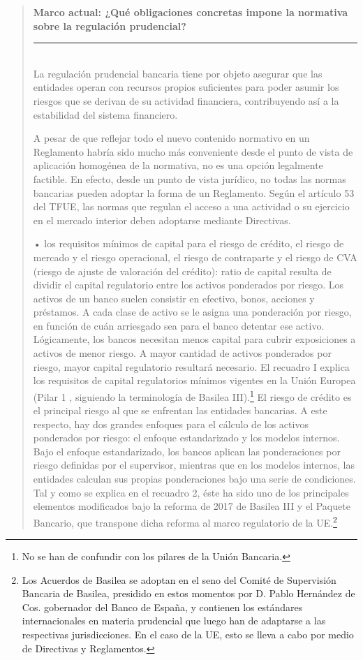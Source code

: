 \documentclass[10pt,a4paper]{article}
\newenvironment{specialblock}[1]{%
      \begin{quote} %
      \small %
      \noindent\textbf{#1}\\[-0.3em] %
      \rule{\linewidth}{0.4pt}\\[0.6em]}{
      \end{quote}}
\begin{document}
\begin{specialblock}{Marco actual: ¿Qué obligaciones concretas impone la normativa sobre la regulación prudencial?}
    La regulación prudencial bancaria tiene por objeto asegurar que las entidades operan con recursos propios suficientes para poder asumir los riesgos que se derivan de su actividad financiera, contribuyendo así a la estabilidad del sistema financiero. 

    A pesar de que reflejar todo el nuevo contenido normativo en un Reglamento habría sido mucho más conveniente desde el punto de vista de aplicación homogénea de la normativa, no es una opción legalmente factible. En efecto, desde un punto de vista jurídico, no todas las normas bancarias pueden adoptar la forma de un Reglamento. Según el artículo 53 del TFUE, las normas que regulan el acceso a una actividad o su ejercicio en el mercado interior deben adoptarse mediante Directivas.
    
    • los requisitos mínimos de capital para el riesgo de crédito, el riesgo de mercado y el riesgo operacional, el riesgo de contraparte y el riesgo de CVA (riesgo de ajuste de valoración del crédito): ratio de capital resulta de dividir el capital regulatorio entre los activos ponderados por riesgo. Los activos de un banco suelen consistir en efectivo, bonos, acciones y préstamos. A cada clase de activo se le asigna una ponderación por riesgo, en función de cuán arriesgado sea para el banco detentar ese activo. Lógicamente, los bancos necesitan menos capital para cubrir exposiciones a activos de menor riesgo. A mayor cantidad de activos ponderados por riesgo, mayor capital regulatorio resultará necesario. El recuadro I explica los requisitos de capital regulatorios mínimos vigentes en la Unión Europea (Pilar 1 , siguiendo la terminología de Basilea III).\footnote{No se han de confundir con los pilares de la Unión Bancaria.
    } El riesgo de crédito es el principal riesgo al que se enfrentan las entidades bancarias. A este respecto, hay dos grandes enfoques para el cálculo de los activos ponderados por riesgo: el enfoque estandarizado y los modelos internos. Bajo el enfoque estandarizado, los bancos aplican las ponderaciones por riesgo definidas por el supervisor, mientras que en los modelos internos, las entidades calculan sus propias ponderaciones bajo una serie de condiciones. Tal y como se explica en el recuadro 2, éste ha sido uno de los principales elementos modificados bajo la reforma de 2017 de Basilea III y el Paquete Bancario, que transpone dicha reforma al marco regulatorio de la UE.\footnote{%
        Los Acuerdos de Basilea se adoptan en el seno del Comité de Supervisión Bancaria de Basilea, presidido en estos momentos por D. Pablo Hernández de Cos. gobernador del Banco de España, y contienen los estándares internacionales en materia prudencial que luego han de adaptarse a las respectivas jurisdicciones. En el caso de la UE, esto se lleva a cabo por medio de Directivas y Reglamentos.
    }
    

\end{specialblock}
\end{document}
